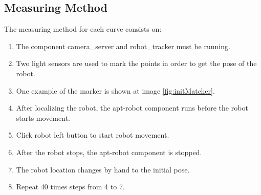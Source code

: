 \documentclass[10pt]{scrartcl}
\begin{document}
\subsection{Measuring Method}

The measuring method for each curve consists on:
\begin{enumerate}
	\item The component camera\_server and robot\_tracker must be running.
	\item Two light sensors are used to mark the points in order to get the pose of the robot.
	\item One example of the marker is shown at image \ref{fig:initMatcher}.
	\item After localizing the robot, the apt-robot component runs before the robot starts movement.
	\item Click robot left button to start robot movement.
	\item After the robot stops, the apt-robot component is stopped.
	\item The robot location changes by hand to the initial pose.
	\item Repeat 40 times steps from 4 to 7.
\end{enumerate}
\end{document}

